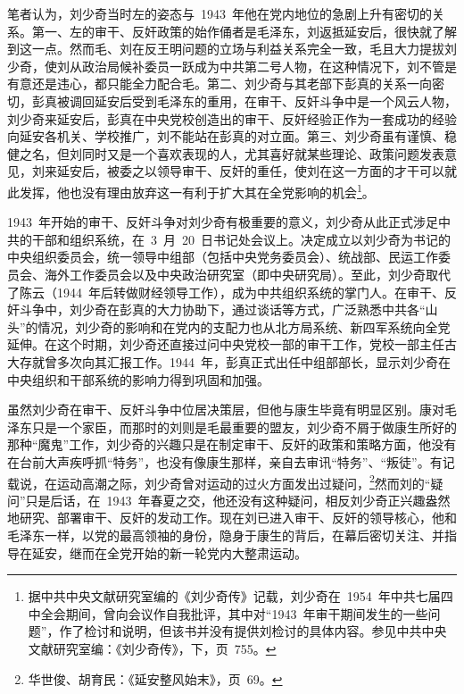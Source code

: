 笔者认为，刘少奇当时左的姿态与~1943~年他在党内地位的急剧上升有密切的关系。第一、左的审干、反奸政策的始作俑者是毛泽东，刘返抵延安后，很快就了解到这一点。然而毛、刘在反王明问题的立场与利益关系完全一致，毛且大力提拔刘少奇，使刘从政治局候补委员一跃成为中共第二号人物，在这种情况下，刘不管是有意还是违心，都只能全力配合毛。第二、刘少奇与其老部下彭真的关系一向密切，彭真被调回延安后受到毛泽东的重用，在审干、反奸斗争中是一个风云人物，刘少奇来延安后，彭真在中央党校创造出的审干、反奸经验正作为一套成功的经验向延安各机关、学校推广，刘不能站在彭真的对立面。第三、刘少奇虽有谨慎、稳健之名，但刘同时又是一个喜欢表现的人，尤其喜好就某些理论、政策问题发表意见，刘来延安后，被委之以领导审干、反奸的重任，使刘在这一方面的才干可以就此发挥，他也没有理由放弃这一有利于扩大其在全党影响的机会\footnote{据中共中央文献研究室编的《刘少奇传》记载，刘少奇在~1954~年中共七届四中全会期间，曾向会议作自我批评，其中对“1943~年审干期间发生的一些问题”，作了检讨和说明，但该书并没有提供刘检讨的具体内容。参见中共中央文献研究室编：《刘少奇传》，下，页~755。}。

1943~年开始的审干、反奸斗争对刘少奇有极重要的意义，刘少奇从此正式涉足中共的干部和组织系统，在~3~月~20~日书记处会议上。决定成立以刘少奇为书记的中央组织委员会，统一领导中组部（包括中央党务委员会）、统战部、民运工作委员会、海外工作委员会以及中央政治研究室（即中央研究局）。至此，刘少奇取代了陈云（1944~年后转做财经领导工作），成为中共组织系统的掌门人。在审干、反奸斗争中，刘少奇在彭真的大力协助下，通过谈话等方式，广泛熟悉中共各“山头”的情况，刘少奇的影响和在党内的支配力也从北方局系统、新四军系统向全党延伸。在这个时期，刘少奇还直接过问中央党校一部的审干工作，党校一部主任古大存就曾多次向其汇报工作。1944~年，彭真正式出任中组部部长，显示刘少奇在中央组织和干部系统的影响力得到巩固和加强。

虽然刘少奇在审干、反奸斗争中位居决策层，但他与康生毕竟有明显区别。康对毛泽东只是一个家臣，而那时的刘则是毛最重要的盟友，刘少奇不屑于做康生所好的那种“魔鬼”工作，刘少奇的兴趣只是在制定审干、反奸的政策和策略方面，他没有在台前大声疾呼抓“特务”，也没有像康生那样，亲自去审讯“特务”、“叛徒”。有记载说，在运动高潮之际，刘少奇曾对运动的过火方面发出过疑问，\footnote{华世俊、胡育民：《延安整风始末》，页~69。}然而刘的“疑问”只是后话，在~1943~年春夏之交，他还没有这种疑问，相反刘少奇正兴趣盎然地研究、部署审干、反奸的发动工作。现在刘已进入审干、反奸的领导核心，他和毛泽东一样，以党的最高领袖的身份，隐身于康生的背后，在幕后密切关注、并指导在延安，继而在全党开始的新一轮党内大整肃运动。

